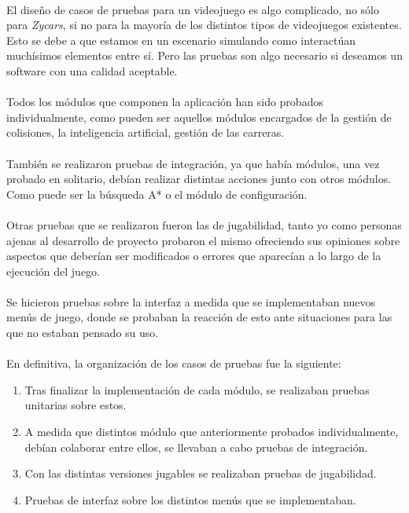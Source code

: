 
\paragraph{}
El diseño de casos de pruebas para un videojuego es algo complicado, no sólo para \emph{Zycars}, si no para la mayoría de los
distintos tipos de videojuegos existentes. Esto se debe a que estamos en un
escenario simulando como interactúan muchísimos 
elementos entre sí. Pero las pruebas son algo necesario si deseamos un software con una calidad aceptable.

\paragraph{}
Todos los módulos que componen la aplicación han sido probados individualmente, como pueden ser aquellos módulos 
encargados de la gestión de colisiones, la inteligencia artificial, gestión de las carreras.

\paragraph{}
También se realizaron pruebas de integración, ya que había módulos, una vez probado en solitario, debían realizar distintas acciones 
junto con otros módulos. Como puede ser la búsqueda A* o el módulo de configuración.

\paragraph{}
Otras pruebas que se realizaron fueron las de jugabilidad, tanto yo como
personas ajenas al desarrollo de proyecto probaron el 
mismo ofreciendo sus opiniones sobre aspectos que deberían ser modificados o
errores que aparecían a lo largo de la ejecución
del juego.

\paragraph{}
Se hicieron pruebas sobre la interfaz a medida que se implementaban nuevos menús de juego, donde se probaban
la reacción de esto ante situaciones para las que no estaban pensado su uso.

\paragraph{}
En definitiva, la organización de los casos de pruebas fue la siguiente:

\begin{enumerate}
    \item Tras finalizar la implementación de cada módulo, se realizaban pruebas unitarias sobre estos.
    \item A medida que distintos módulo que anteriormente probados individualmente, debían colaborar entre ellos, se
    llevaban a cabo pruebas de integración.
    \item Con las distintas versiones jugables se realizaban pruebas de jugabilidad.
    \item Pruebas de interfaz sobre los distintos menús que se implementaban.
\end{enumerate}

